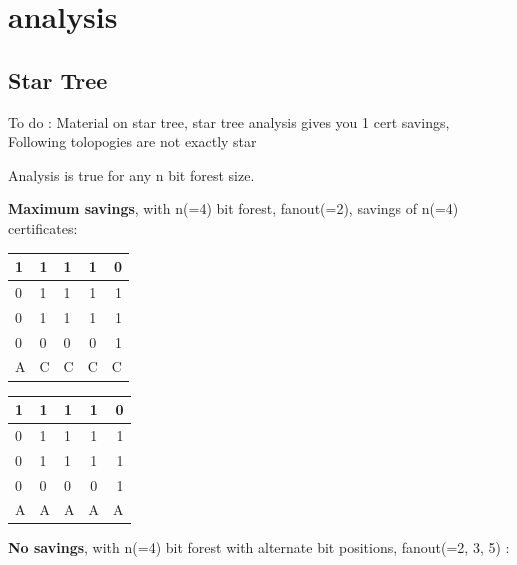 \chapter{analysis}

\section{Star Tree}
	
	To do : Material on star tree, star tree analysis gives you 1 cert savings, Following tolopogies are not exactly star  

	Analysis is true for any n bit forest size.

	\textbf{Maximum savings}, with n(=4) bit forest, fanout(=2), savings of n(=4) certificates:

	\begin{multicols}{2}

		\begin{tabular}{ l | l l c r }
		  1 & 1 & 1 & 1 & 0 \\
		  \hline
		  0 & 1 & 1 & 1 & 1 \\
		  0 & 1 & 1 & 1 & 1 \\
		  0 & 0 & 0 & 0 & 1 \\
		  \hline	
		  A & C & C & C & C\\
		\end{tabular}
	\columnbreak{|}
		\begin{tabular}{ l | l l c r }
		  1 & 1 & 1 & 1 & 0 \\
		  \hline
		  0 & 1 & 1 & 1 & 1 \\
		  0 & 1 & 1 & 1 & 1 \\
		  0 & 0 & 0 & 0 & 1 \\
		  \hline	
		  A & A & A & A & A\\
		\end{tabular}
	\end{multicols}

	\textbf{No savings}, with n(=4) bit forest with alternate bit positions, fanout(=2, 3, 5) :

